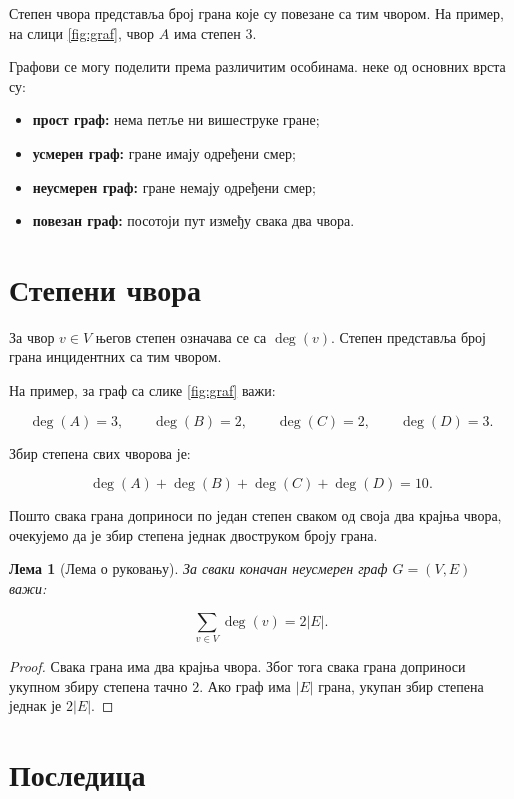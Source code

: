 \documentclass[12pt,a4paper]{article}
\newtheorem{lema}{Лема}[section]
\begin{document}
Степен чвора представља број грана које су повезане са тим чвором.
На пример, на слици \ref{fig:graf}, чвор $A$ има степен $3$.

Графови се могу поделити према различитим особинама. неке од основних врста су:


\begin{itemize}
\item \textbf{прост граф:} нема петље ни вишеструке гране;
\item \textbf{усмерен граф:} гране имају одређени смер;
\item \textbf{неусмерен граф:} гране немају одређени смер;
\item \textbf{повезан граф:} посотоји пут између свака два чвора.
\end{itemize}

\section{Степени чвора}

За чвор $v\in V$ његов степен означава се са $\deg(v)$.
Степен представља број грана инцидентних са тим чвором.

На пример, за граф са слике \ref{fig:graf} важи:

$$
\deg(A)=3,\qquad
\deg(B)=2,\qquad
\deg(C)=2,\qquad
\deg(D)=3.
$$

Збир степена свих чворова је:

$$
\deg(A)+\deg(B)+\deg(C)+\deg(D)=10.
$$

Пошто свака грана доприноси по један степен сваком од своја два
крајња чвора, очекујемо да је збир степена једнак двоструком броју
грана.

\begin{lema}[Лема о руковању]
За сваки коначан неусмерен граф $G=(V,E)$ важи:

$$
\sum_{v\in V}\deg(v)=2|E|.
$$

\end{lema}

\begin{proof}
Свака грана има два крајња чвора. Због тога свака грана доприноси
укупном збиру степена тачно $2$. Ако граф има $|E|$ грана, укупан збир
степена једнак је $2|E|$.
\end{proof}

\section{Последица}
\end{document}
